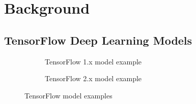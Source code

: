 \section{Background}\label{sec:background}

\subsection{TensorFlow Deep Learning Models}


\begin{figure}[t!]
    \centering
    \begin{subfigure}[b]{\textwidth}
      
      \caption{TensorFlow 1.x model example}
      \label{fig:back:tf1}
    \end{subfigure}   
    \begin{subfigure}[b]{\textwidth}
      
      \caption{TensorFlow 2.x model example}
      \label{fig:back:tf2}
    \end{subfigure}   
    \caption{TensorFlow model examples}
\end{figure}

